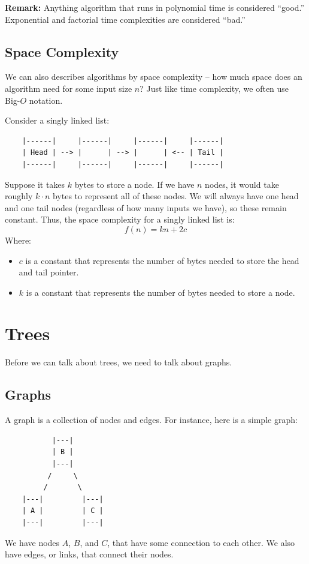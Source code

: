 \documentclass[letterpaper]{article}
\begin{document}
\textbf{Remark:} Anything algorithm that runs in polynomial time is considered ``good.'' Exponential and factorial time complexities are considered ``bad.''

\subsection{Space Complexity}
We can also describes algorithms by space complexity -- how much space does an algorithm need for some input size $n$? Just like time complexity, we often use Big-$O$ notation.

\bigskip 

Consider a singly linked list: 
\begin{verbatim}
    |------|     |------|     |------|     |------| 
    | Head | --> |      | --> |      | <-- | Tail | 
    |------|     |------|     |------|     |------|
\end{verbatim}
Suppose it takes $k$ bytes to store a node. If we have $n$ nodes, it would take roughly $k \cdot n$ bytes to represent all of these nodes. We will always have one head and one tail nodes (regardless of how many inputs we have), so these remain constant. Thus, the space complexity for a singly linked list is: 
\[f(n) = kn + 2c\]
Where: 
\begin{itemize}
    \item $c$ is a constant that represents the number of bytes needed to store the head and tail pointer.
    \item $k$ is a constant that represents the number of bytes needed to store a node. 
\end{itemize}













\newpage 
\section{Trees}
Before we can talk about trees, we need to talk about graphs. 

\subsection{Graphs}
A graph is a collection of nodes and edges. For instance, here is a simple graph: 
\begin{verbatim}
           |---|
           | B |
           |---|
          /     \
         /       \
    |---|         |---|
    | A |         | C |
    |---|         |---|
\end{verbatim}
We have nodes $A$, $B$, and $C$, that have some connection to each other. We also have edges, or links, that connect their nodes. 
\end{document}
